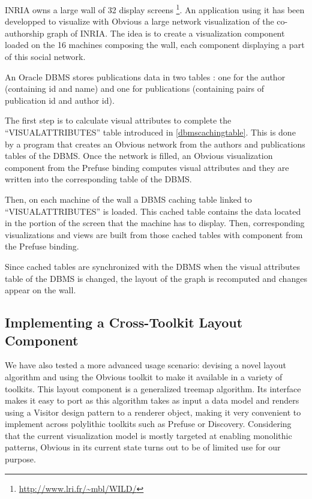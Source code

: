 INRIA owns a large wall of 32 display screens
\footnote{\url{http://www.lri.fr/~mbl/WILD/}}. An application using it
has been developped to visualize with Obvious a large network visualization
of the co-authorship graph of INRIA. The idea is to create a visualization
component loaded on the 16 machines composing the wall, each component
displaying a part of this social network.

An Oracle DBMS stores publications data in two tables : one for the author
(containing id and name) and one for publications (containing pairs
of publication id and author id).

The first step is to calculate visual attributes to complete the
``VISUALATTRIBUTES'' table introduced in \ref{dbmscachingtable}.
This is done by a program that creates an Obvious network from
the authors and publications tables of the DBMS. Once the network is filled,
an Obvious visualization component from the Prefuse binding computes visual
attributes and they are written into the corresponding table of the
DBMS.

Then, on each machine of the wall a DBMS caching table linked to
``VISUALATTRIBUTES'' is loaded. This cached table contains the data
located in the portion of the screen that the machine has to display.
Then, corresponding visualizations and views are built from those
cached tables with component from the Prefuse binding.

Since cached tables are synchronized with the DBMS when the visual
attributes table of the DBMS is changed, the layout of the graph is
recomputed and changes appear on the wall.

\subsection{Implementing a Cross-Toolkit Layout Component}

We have also tested a more advanced usage scenario: devising
a novel layout algorithm and using the Obvious toolkit to make it
available in a variety of toolkits. This layout component is a
generalized treemap algorithm.
Its interface makes it easy to port as this
algorithm takes as input a data model and renders using a Visitor
design pattern to a renderer object, making it very convenient to
implement across polylithic toolkits such as Prefuse or Discovery.
Considering that the current visualization model is mostly targeted at
enabling monolithic patterns, Obvious in its current state turns out
to be of limited use for our purpose.

